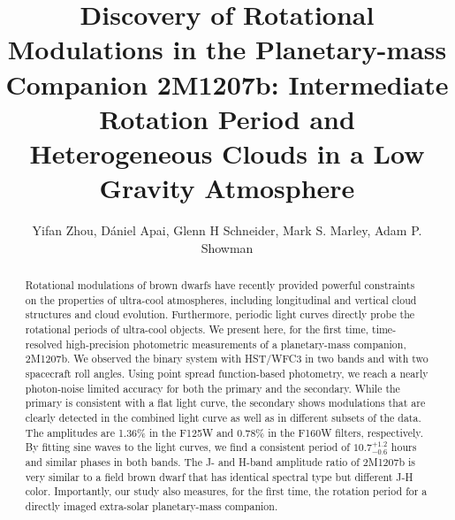 \documentclass[apj]{emulateapj}
\newcommand{\reviseTwo}[1]{\textbf{{\color{cyan}{#1}}}}
\renewcommand{\reviseTwo}{}
\newcommand{\period}{$10.7^{+1.2}_{-0.6}$}
\begin{document}
\title{Discovery of Rotational Modulations in the Planetary-mass
  Companion 2M1207\lowercase{b}: Intermediate Rotation Period and Heterogeneous Clouds in a Low
  Gravity Atmosphere}
\author{Yifan Zhou, D\'aniel Apai,
  Glenn H Schneider,  Mark S. Marley,
  Adam P. Showman}


\begin{abstract}
  Rotational modulations of brown dwarfs have recently provided
  powerful constraints on the properties of ultra-cool atmospheres,
  including longitudinal and vertical cloud structures and cloud
  evolution. Furthermore, periodic light curves directly probe the
  rotational periods of ultra-cool objects.  We present here, for the
  first time, time-resolved high-precision photometric measurements of
  a planetary-mass companion, 2M1207b.  We observed the binary
  system with HST/WFC3 in two bands and with two spacecraft roll
  angles. Using point spread function-based photometry, we reach a
  nearly photon-noise limited accuracy for both the primary and the
  secondary. While the primary is consistent with a flat light curve,
  the secondary shows modulations that are clearly detected in the
  combined light curve as well as in different subsets of the data.
  The amplitudes are 1.36\% in the F125W and 0.78\% in the F160W
  filters, respectively.  \reviseTwo{By fitting sine waves to the
  light curves,} we find a consistent period of
\period{} hours and
  similar phases in both bands. The J- and H-band amplitude ratio of
  2M1207b is very similar to a field brown dwarf that has identical
  spectral type but different J-H color.  Importantly, our study also
  measures, for the first time, the rotation period for a directly 
  imaged \reviseTwo{extra-solar planetary-mass companion.}
\end{abstract}
\end{document}
